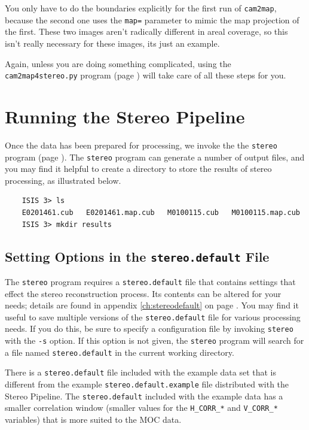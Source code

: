 You only have to do the boundaries explicitly for the first run of
\texttt{cam2map}, because the second one uses the \texttt{map=}
parameter to mimic the map projection of the first.  These two
images aren't radically different in areal coverage, so this isn't
really necessary for these images, its just an example.

Again, unless you are doing something complicated, using the \texttt{cam2map4stereo.py} 
program (page \pageref{cam2map4stereo}) will take care of all these steps for you.

\section{Running the Stereo Pipeline}

Once the data has been prepared for processing, we invoke the the
\texttt{stereo} program (page \pageref{stereo}).  The \texttt{stereo}
program can generate a number of output files, and you may find it
helpful to create a directory to store the results of stereo
processing, as illustrated below.

\begin{verbatim}
    ISIS 3> ls
    E0201461.cub   E0201461.map.cub   M0100115.cub   M0100115.map.cub
    ISIS 3> mkdir results
\end{verbatim}

\subsection{Setting Options in the \texttt{stereo.default} File}

The \texttt{stereo} program requires a \texttt{stereo.default} file
that contains settings that effect the stereo reconstruction process.
Its contents can be altered for your needs; details are found in
appendix \ref{ch:stereodefault} on page \pageref{ch:stereodefault}.
You may find it useful to save multiple versions of the
\texttt{stereo.default} file for various processing needs. If you do
this, be sure to specify a configuration file by invoking
\texttt{stereo} with the \texttt{-s} option.  If this option is not
given, the \texttt{stereo} program will search for a file named
\texttt{stereo.default} in the current working directory.

There is a \texttt{stereo.default} file included with the example data
set that is different from the example \texttt{stereo.default.example}
file distributed with the Stereo Pipeline.  The
\texttt{stereo.default} included with the example data has a smaller
correlation window (smaller values for the \texttt{H\_CORR\_*} and
\texttt{V\_CORR\_*} variables) that is more suited to the MOC data.

